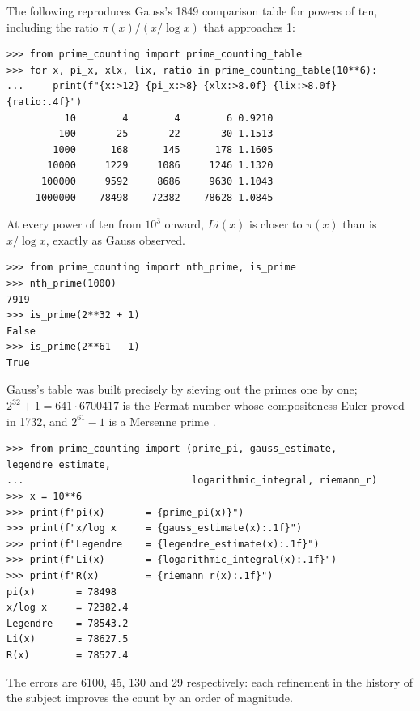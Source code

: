 \begin{example}
The following reproduces Gauss's 1849 comparison table for powers of ten, including the ratio $\pi(x)/(x/\log x)$ that approaches 1:
\begin{lstlisting}[style=python]
>>> from prime_counting import prime_counting_table
>>> for x, pi_x, xlx, lix, ratio in prime_counting_table(10**6):
...     print(f"{x:>12} {pi_x:>8} {xlx:>8.0f} {lix:>8.0f} {ratio:.4f}")
          10        4        4        6 0.9210
         100       25       22       30 1.1513
        1000      168      145      178 1.1605
       10000     1229     1086     1246 1.1320
      100000     9592     8686     9630 1.1043
     1000000    78498    72382    78628 1.0845
\end{lstlisting}
At every power of ten from $10^3$ onward, $Li(x)$ is closer to $\pi(x)$ than is $x/\log x$, exactly as Gauss observed.
\end{example}

\begin{example}
\begin{lstlisting}[style=python]
>>> from prime_counting import nth_prime, is_prime
>>> nth_prime(1000)
7919
>>> is_prime(2**32 + 1)
False
>>> is_prime(2**61 - 1)
True
\end{lstlisting}
Gauss's table was built precisely by sieving out the primes one by one; $2^{32}+1 = 641 \cdot 6700417$ is the Fermat number whose compositeness Euler proved in 1732, and $2^{61}-1$ is a Mersenne prime .
\end{example}

\begin{example}[The Approximations at $x = 10^6$]
\begin{lstlisting}[style=python]
>>> from prime_counting import (prime_pi, gauss_estimate, legendre_estimate,
...                             logarithmic_integral, riemann_r)
>>> x = 10**6
>>> print(f"pi(x)       = {prime_pi(x)}")
>>> print(f"x/log x     = {gauss_estimate(x):.1f}")
>>> print(f"Legendre    = {legendre_estimate(x):.1f}")
>>> print(f"Li(x)       = {logarithmic_integral(x):.1f}")
>>> print(f"R(x)        = {riemann_r(x):.1f}")
pi(x)       = 78498
x/log x     = 72382.4
Legendre    = 78543.2
Li(x)       = 78627.5
R(x)        = 78527.4
\end{lstlisting}
The errors are 6100, 45, 130 and 29 respectively: each refinement in the history of the subject improves the count by an order of magnitude.
\end{example}

